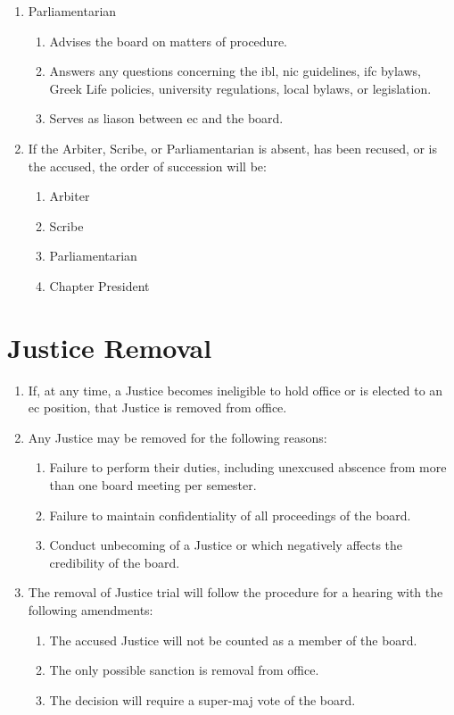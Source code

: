 \begin{enumerate}
		\item Parliamentarian
			\begin{enumerate}
				\item Advises the board on matters of procedure.
				\item Answers any questions concerning the \gls{ibl}, \gls{nic} guidelines, \gls{ifc} bylaws, Greek Life policies, university regulations, local bylaws, or legislation.
				\item Serves as liason between \gls{ec} and the board.
			\end{enumerate}

		\item If the Arbiter, Scribe, or Parliamentarian is absent, has been recused, or is the accused, the order of succession will be:
			\begin{enumerate}
				\item Arbiter
				\item Scribe
				\item Parliamentarian
				\item Chapter President
			\end{enumerate}

	\end{enumerate}

\section{Justice Removal}
	\begin{enumerate}
		\item If, at any time, a Justice becomes ineligible to hold office or is elected to an \gls{ec} position, that Justice is removed from office.
		\item Any Justice may be removed for the following reasons:
			\begin{enumerate}
				\item Failure to perform their duties, including unexcused abscence from more than one board meeting per semester.
				\item Failure to maintain confidentiality of all proceedings of the board.
				\item Conduct unbecoming of a Justice or which negatively affects the credibility of the board.
			\end{enumerate}
		\item The removal of Justice trial will follow the procedure for a hearing with the following amendments:
			\begin{enumerate}
				\item The accused Justice will not be counted as a member of the board.
				\item The only possible sanction is removal from office.
				\item The decision will require a \gls{super-maj} vote of the board.
			\end{enumerate}
	\end{enumerate}

